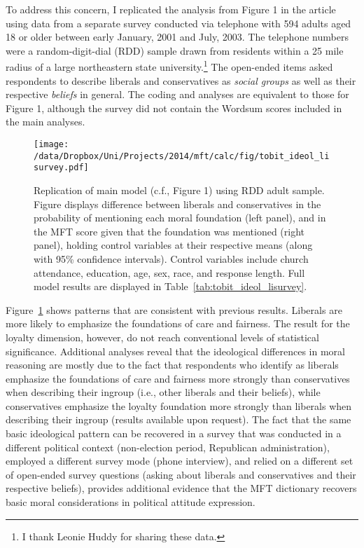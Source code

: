 To address this concern, I replicated the analysis from Figure 1 in the article using data from a separate survey conducted via telephone with 594 adults aged 18 or older between early January, 2001 and July, 2003. The telephone numbers were a random-digit-dial (RDD) sample drawn from residents within a 25 mile radius of a large northeastern state university.\footnote{I thank Leonie Huddy for sharing these data.} The open-ended items asked respondents to describe liberals and conservatives as \textit{social groups} as well as their respective \textit{beliefs} in general. The coding and analyses are equivalent to those for Figure 1, although the survey did not contain the Wordsum scores included in the main analyses.

\begin{figure}[ht]\centering
\texttt{[image: /data/Dropbox/Uni/Projects/2014/mft/calc/fig/tobit\_ideol\_lisurvey.pdf]}
\caption[Replication of main model predicting MFT scores based on ideology using RDD adult sample]{Replication of main model (c.f., Figure 1) using RDD adult sample. Figure displays difference between liberals and conservatives in the probability of mentioning each moral foundation (left panel), and in the MFT score given that the foundation was mentioned (right panel), holding control variables at their respective means (along with 95\% confidence intervals). Control variables include church attendance, education, age, sex, race, and response length. Full model results are displayed in Table~\ref{tab:tobit_ideol_lisurvey}.
}\label{fig:tobit_ideol_lisurvey}
\end{figure}

Figure~\ref{fig:tobit_ideol_lisurvey} shows patterns that are consistent with previous results. Liberals are more likely to emphasize the foundations of care and fairness. The result for the loyalty dimension, however, do not reach conventional levels of statistical significance. Additional analyses reveal that the ideological differences in moral reasoning are mostly due to the fact that respondents who identify as liberals emphasize the foundations of care and fairness more strongly than conservatives when describing their ingroup (i.e., other liberals and their beliefs), while conservatives emphasize the loyalty foundation more strongly than liberals when describing their ingroup (results available upon request). The fact that the same basic ideological pattern can be recovered in a survey that was conducted in a different political context (non-election period, Republican administration), employed a different survey mode (phone interview), and relied on a different set of open-ended survey questions (asking about liberals and conservatives and their respective beliefs), provides additional evidence that the MFT dictionary recovers basic moral considerations in political attitude expression.


